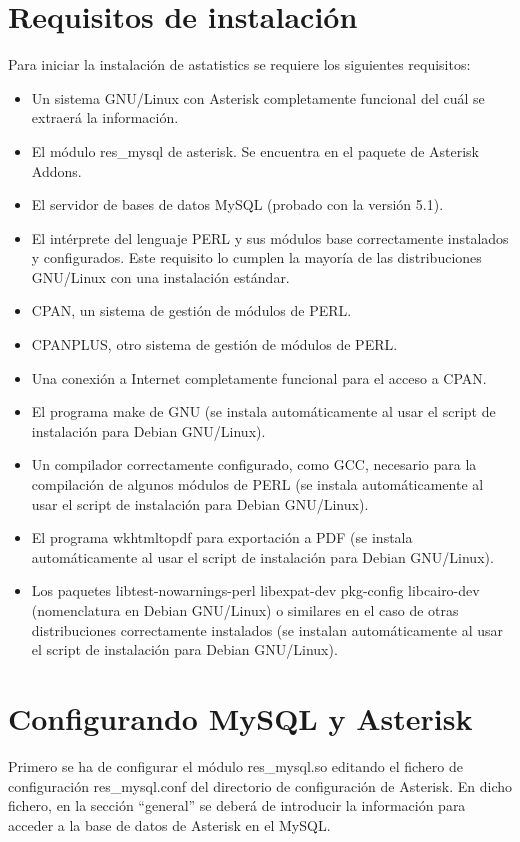 \documentclass[spanish,12pt]{book}
\begin{document}
\section{Requisitos de instalación}
Para iniciar la instalación de astatistics se requiere los siguientes requisitos:
\begin{itemize}
\item Un sistema GNU/Linux con Asterisk completamente funcional del cuál se extraerá la información.
\item El módulo res\_mysql de asterisk. Se encuentra en el paquete de Asterisk Addons.
\item El servidor de bases de datos MySQL (probado con la versión 5.1).
\item El intérprete del lenguaje PERL y sus módulos base correctamente instalados y configurados. Este requisito lo cumplen la mayoría de las distribuciones GNU/Linux con una instalación estándar.
\item CPAN, un sistema de gestión de módulos de PERL.
\item CPANPLUS, otro sistema de gestión de módulos de PERL.
\item Una conexión a Internet completamente funcional para el acceso a CPAN.
\item El programa make de GNU (se instala automáticamente al usar el script de instalación para Debian GNU/Linux).
\item Un compilador correctamente configurado, como GCC, necesario para la compilación de algunos módulos de PERL (se instala automáticamente al usar el script de instalación para Debian GNU/Linux).
\item El programa wkhtmltopdf para exportación a PDF (se instala automáticamente al usar el script de instalación para Debian GNU/Linux).
\item Los paquetes libtest-nowarnings-perl libexpat-dev pkg-config libcairo-dev (nomenclatura en Debian GNU/Linux) o similares en el caso de otras distribuciones correctamente instalados  (se instalan automáticamente al usar el script de instalación para Debian GNU/Linux).
\end{itemize}

\section{Configurando MySQL y Asterisk}
Primero se ha de configurar el módulo res\_mysql.so editando el fichero de configuración res\_mysql.conf del directorio de configuración de Asterisk. En dicho fichero, en la sección ``general'' se deberá de introducir la información para acceder a la base de datos de Asterisk en el MySQL.
\end{document}
